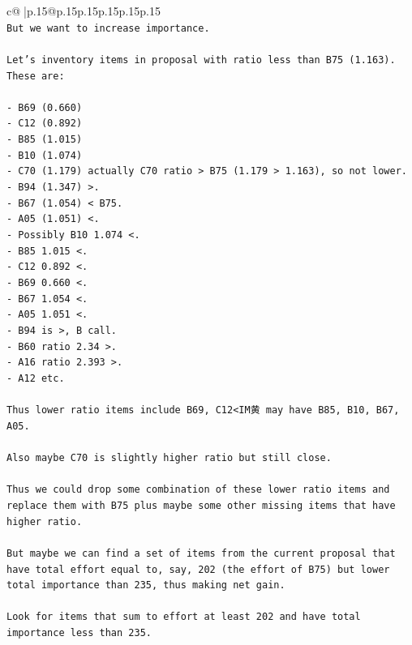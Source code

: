 \documentclass{article}
\begin{document}
{\begin{supertabular}{c@{$\;$}|p{.15\linewidth}@{}p{.15\linewidth}p{.15\linewidth}p{.15\linewidth}p{.15\linewidth}p{.15\linewidth}}
{{{\\ 
\texttt{But we want to increase importance.} \\
\\ 
\texttt{Let's inventory items in proposal with ratio less than B75 (1.163). These are:} \\
\\ 
\texttt{{-} B69 (0.660)} \\
\texttt{{-} C12 (0.892)} \\
\texttt{{-} B85 (1.015)} \\
\texttt{{-} B10 (1.074)} \\
\texttt{{-} C70 (1.179) actually C70 ratio > B75 (1.179 > 1.163), so not lower.} \\
\texttt{{-} B94 (1.347) >.} \\
\texttt{{-} B67 (1.054) < B75.} \\
\texttt{{-} A05 (1.051) <.} \\
\texttt{{-} Possibly B10 1.074 <.} \\
\texttt{{-} B85 1.015 <.} \\
\texttt{{-} C12 0.892 <.} \\
\texttt{{-} B69 0.660 <.} \\
\texttt{{-} B67 1.054 <.} \\
\texttt{{-} A05 1.051 <.} \\
\texttt{{-} B94 is >, B call.} \\
\texttt{{-} B60 ratio 2.34 >.} \\
\texttt{{-} A16 ratio 2.393 >.} \\
\texttt{{-} A12 etc.} \\
\\ 
\texttt{Thus lower ratio items include B69, C12<IM黄 may have B85, B10, B67, A05.} \\
\\ 
\texttt{Also maybe C70 is slightly higher ratio but still close.} \\
\\ 
\texttt{Thus we could drop some combination of these lower ratio items and replace them with B75 plus maybe some other missing items that have higher ratio.} \\
\\ 
\texttt{But maybe we can find a set of items from the current proposal that have total effort equal to, say, 202 (the effort of B75) but lower total importance than 235, thus making net gain.} \\
\\ 
\texttt{Look for items that sum to effort at least 202 and have total importance less than 235.} \\
}}}
\end{supertabular}}
\end{document}
